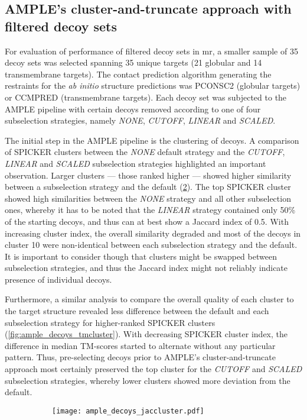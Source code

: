 \subsection{AMPLE's cluster-and-truncate approach with filtered decoy sets}
For evaluation of performance of filtered decoy sets in \gls{mr}, a smaller sample of 35 decoy sets was selected spanning 35 unique targets (21 globular and 14 transmembrane targets). The contact prediction algorithm generating the restraints for the \textit{ab initio} structure predictions was PCONSC2 (globular targets) or CCMPRED (transmembrane targets). Each decoy set was subjected to the AMPLE pipeline with certain decoys removed according to one of four subselection strategies, namely \textit{NONE}, \textit{CUTOFF}, \textit{LINEAR} and \textit{SCALED}.

The initial step in the AMPLE pipeline is the clustering of decoys. A comparison of SPICKER clusters between the \textit{NONE} default strategy and the \textit{CUTOFF}, \textit{LINEAR} and \textit{SCALED} subselection strategies highlighted an important observation. Larger clusters --- those ranked higher --- showed higher similarity between a subselection strategy and the default (\cref{fig:ample_decoys_jaccluster}). The top SPICKER cluster showed high similarities between the \textit{NONE} strategy and all other subselection ones, whereby it has to be noted that the \textit{LINEAR} strategy contained only 50\% of the starting decoys, and thus can at best show a Jaccard index of 0.5. With increasing cluster index, the overall similarity degraded and most of the decoys in cluster 10 were non-identical between each subselection strategy and the default. It is important to consider though that clusters might be swapped between subselection strategies, and thus the Jaccard index might not reliably indicate presence of individual decoys.

Furthermore, a similar analysis to compare the overall quality of each cluster to the target structure revealed less difference between the default and each subselection strategy for higher-ranked SPICKER clusters (\cref{fig:ample_decoys_tmcluster}). With decreasing SPICKER cluster index, the difference in median TM-scores started to alternate without any particular pattern. Thus, pre-selecting decoys prior to AMPLE's cluster-and-truncate approach most certainly preserved the top cluster for the \textit{CUTOFF} and \textit{SCALED} subselection strategies, whereby lower clusters showed more deviation from the default.

\begin{figure}[H]
    \centering
    \begin{subfigure}[b]{\textwidth}
        \texttt{[image: ample\_decoys\_jaccluster.pdf]}
        \caption{}
        \label{fig:ample_decoys_jaccluster}
    \end{subfigure}
\end{figure}

